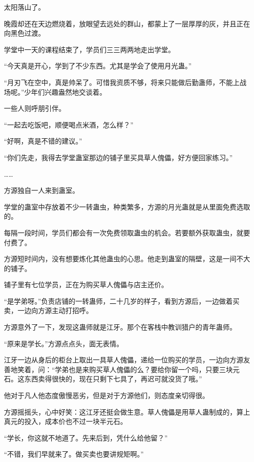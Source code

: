 
\begin{this_body}

太阳落山了。

晚霞却还在天边燃烧着，放眼望去远处的群山，都蒙上了一层厚厚的灰，并且正在向黑色过渡。

学堂中一天的课程结束了，学员们三三两两地走出学堂。

“今天真是开心，学到了不少东西。尤其是学会了使用月光蛊。”

“月刃飞在空中，真是帅呆了。可惜我资质不够，将来只能做后勤蛊师，不能上战场呢。”少年们兴趣盎然地交谈着。

一些人则呼朋引伴。

“一起去吃饭吧，顺便喝点米酒，怎么样？”

“好啊，真是不错的建议。”

“你们先走，我得去学堂蛊室那边的铺子里买具草人傀儡，好方便回家练习。”

……

方源独自一人来到蛊室。

学堂的蛊室中存放着不少一转蛊虫，种类繁多，方源的月光蛊就是从里面免费选取的。

每隔一段时间，学员们都会有一次免费领取蛊虫的机会。若要额外获取蛊虫，就要付费了。

方源短时间内，没有想要炼化其他蛊虫的心思。他走到蛊室的隔壁，这是一间不大的铺子。

铺子里有七位学员，正在为购买草人傀儡与店主还价。

“是学弟呀。”负责店铺的一转蛊师，二十几岁的样子，看到方源后，一边做着买卖，一边向方源主动打招呼。

方源意外了一下，发现这蛊师就是江牙。那个在客栈中教训猎户的青年蛊师。

“原来是学长。”方源点点头，面无表情。

江牙一边从身后的柜台上取出一具草人傀儡，递给一位购买的学员，一边向方源友善地笑着，问：“学弟也是来购买草人傀儡的么？要给你留一个吗，只要三块元石。这东西卖得很快的，现在只剩下七具了，再迟可就没货了哦。”

他对于凡人他态度傲慢恶劣，但是对于方源他们，则态度亲切得很。

方源摇摇头，心中好笑：这江牙还挺会做生意。草人傀儡是用草人蛊制成的，算上真元的投入，成本价也不过一块半元石。

“学长，你这就不地道了。先来后到，凭什么给他留？”

“不错，我们早就来了。做买卖也要讲规矩啊。”


\end{this_body}
